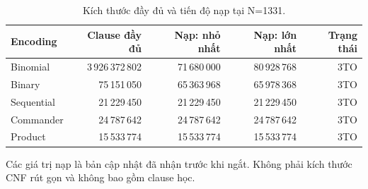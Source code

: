 \begin{table}[pos=H]
\centering
\footnotesize
\caption{Kích thước đầy đủ và tiến độ nạp tại N=1331.}
\label{tab:progress_1331}
\setlength{\tabcolsep}{4pt}
\begin{tabular}{@{}lrrrr@{}}
\toprule
Encoding & Clause đầy đủ & Nạp: nhỏ nhất & Nạp: lớn nhất & Trạng thái \\
\midrule
Binomial & 3\,926\,372\,802 & 71\,680\,000 & 80\,928\,768 & 3TO \\
Binary & 75\,151\,050 & 65\,363\,968 & 65\,978\,368 & 3TO \\
Sequential & 21\,229\,450 & 21\,229\,450 & 21\,229\,450 & 3TO \\
Commander & 24\,787\,642 & 24\,787\,642 & 24\,787\,642 & 3TO \\
Product & 15\,533\,774 & 15\,533\,774 & 15\,533\,774 & 3TO \\
\bottomrule
\end{tabular}
\par\smallskip\begin{minipage}{\linewidth}\footnotesize Các giá trị nạp là bản cập nhật đã nhận trước khi ngắt. Không phải kích thước CNF rút gọn và không bao gồm clause học.\end{minipage}
\end{table}
